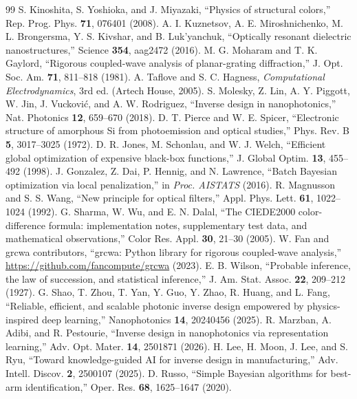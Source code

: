 \documentclass[10pt,twocolumn]{article}
\begin{document}
\begin{thebibliography}{99}
 S. Kinoshita, S. Yoshioka, and J. Miyazaki, ``Physics of structural colors,'' Rep. Prog. Phys. \textbf{71}, 076401 (2008).
 A. I. Kuznetsov, A. E. Miroshnichenko, M. L. Brongersma, Y. S. Kivshar, and B. Luk'yanchuk, ``Optically resonant dielectric nanostructures,'' Science \textbf{354}, aag2472 (2016).
 M. G. Moharam and T. K. Gaylord, ``Rigorous coupled-wave analysis of planar-grating diffraction,'' J. Opt. Soc. Am. \textbf{71}, 811--818 (1981).
 A. Taflove and S. C. Hagness, \textit{Computational Electrodynamics}, 3rd ed. (Artech House, 2005).
 S. Molesky, Z. Lin, A. Y. Piggott, W. Jin, J. Vuckovi\'c, and A. W. Rodriguez, ``Inverse design in nanophotonics,'' Nat. Photonics \textbf{12}, 659--670 (2018).
 D. T. Pierce and W. E. Spicer, ``Electronic structure of amorphous Si from photoemission and optical studies,'' Phys. Rev. B \textbf{5}, 3017--3025 (1972).
 D. R. Jones, M. Schonlau, and W. J. Welch, ``Efficient global optimization of expensive black-box functions,'' J. Global Optim. \textbf{13}, 455--492 (1998).
 J. Gonzalez, Z. Dai, P. Hennig, and N. Lawrence, ``Batch Bayesian optimization via local penalization,'' in \textit{Proc. AISTATS} (2016).
 R. Magnusson and S. S. Wang, ``New principle for optical filters,'' Appl. Phys. Lett. \textbf{61}, 1022--1024 (1992).
 G. Sharma, W. Wu, and E. N. Dalal, ``The CIEDE2000 color-difference formula: implementation notes, supplementary test data, and mathematical observations,'' Color Res. Appl. \textbf{30}, 21--30 (2005).
 W. Fan and grcwa contributors, ``grcwa: Python library for rigorous coupled-wave analysis,'' \url{https://github.com/fancompute/grcwa} (2023).
 E. B. Wilson, ``Probable inference, the law of succession, and statistical inference,'' J. Am. Stat. Assoc. \textbf{22}, 209--212 (1927).
 G. Shao, T. Zhou, T. Yan, Y. Guo, Y. Zhao, R. Huang, and L. Fang, ``Reliable, efficient, and scalable photonic inverse design empowered by physics-inspired deep learning,'' Nanophotonics \textbf{14}, 20240456 (2025).
 R. Marzban, A. Adibi, and R. Pestourie, ``Inverse design in nanophotonics via representation learning,'' Adv. Opt. Mater. \textbf{14}, 2501871 (2026).
 H. Lee, H. Moon, J. Lee, and S. Ryu, ``Toward knowledge-guided AI for inverse design in manufacturing,'' Adv. Intell. Discov. \textbf{2}, 2500107 (2025).
 D. Russo, ``Simple Bayesian algorithms for best-arm identification,'' Oper. Res. \textbf{68}, 1625--1647 (2020).

\end{thebibliography}
\end{document}
